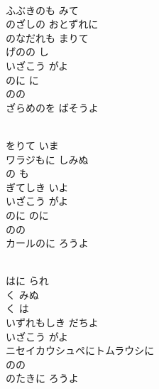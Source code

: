 \documentclass[10pt,b5j]{tarticle} %
\begin{document}
\vspace{1.5em} %
\newcommand{\linespace}{0.5em} %
\newcommand{\blocksize}{0.5\hsize} %
\newcommand{\itemmargin}{6em} %
\begin{enumerate} %
    \setlength{\itemindent}{\itemmargin} %
    \begin{minipage}[c]{\blocksize}
    
        \vspace{\linespace}
        \item~\\
        ふぶきのも みて\\
        のざしの おとずれに\\
        のなだれも まりて\\
        げのの し\\
        いざこう がよ\\
        のに に\\
        のの\\
        ざらめのを ばそうよ
        
        \vspace{\linespace}
        \item~\\
        をりて いま\\
        ワラジもに しみぬ\\
        の も\\
        ぎてしき いよ\\
        いざこう がよ\\
        のに のに\\
        のの\\
        カールのに ろうよ
        
        \vspace{\linespace}
        \item~\\
        はに られ\\
        く みぬ\\
        く は\\
        いずれもしき だちよ\\
        いざこう がよ\\
        ニセイカウシュペにトムラウシに\\
        のの\\
        のたきに ろうよ
        

\end{minipage}
\end{enumerate}
\end{document}
